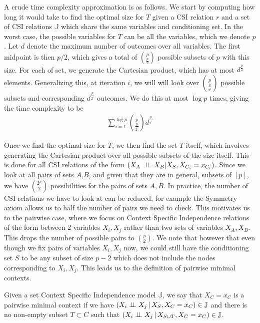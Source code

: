 \documentclass{tufte-book}
\begin{document}
\begin{Definition}
A crude time complexity approximation is as follows. We start by computing how long it would take to find the optimal size for \(T\) given a CSI relation \(r\) and a set of CSI relations \(\mathbb{J}\) which share the same variables and conditioning set. In the worst case, the possible variables for \(T\) can be all the variables, which we denote \(p\). Let \(d\) denote the maximum number of outcomes over all variables. The first midpoint is then \(p/2\), which gives a total of \(p\choose \frac{p}{2}\) possible subsets of \(p\) with this size. For each of set, we generate the Cartesian product, which has at most \(d^{\frac{p}{2}}\) elements. Generalizing this, at iteration \(i\), we will will look over \(p \choose \frac{p}{2^i}\) possible subsets and corresponding \(d^{\frac{p}{2^i}}\) outcomes. We do this at most \(\log p\) times, giving the time complexity to be
\begin{align*}
\sum_{i=1}^{\log p} {p\choose{\frac{p}{2^i}}}d^{\frac{p}{2^i}}
\end{align*}

Once we find the optimal size for \(T\), we then find the set \(T\) itself, which involves generating the Cartesian product over all possible subsets of the size itself. This is done for all CSI relations of the form \((X_A\,\perp \!\!\! \perp\,X_B|X_S,X_{C_i}=x_{C_i})\). Since we look at all pairs of sets \(A\),\(B\), and given that they are in general, subsets of \([p]\), we have \(2^p \choose 2\) possibilities for the pairs of sets \(A,B\). In practice, the number of CSI relations we have to look at can be reduced, for example the Symmetry axiom allows us to half the number of pairs we need to check. This motivates us to the pairwise case, where we focus on Context Specific Independence relations of the form between 2 variables \(X_i,X_j\) rather than two sets of variables \(X_A,X_B\). This drops the number of possible pairs to \(p \choose 2\). We note that however that even though we fix pairs of variables \(X_i,X_j\) now, we could still have the conditioning set \(S\) to be any subset of size \(p-2\) which does not include the nodes corresponding to \(X_i,X_j\). This leads us to the definition of pairwise minimal contexts.


\begin{definition}\label{def:pairmcs}
Given a set Context Specific Independence model $\mathbb{J}$, we say that ${X_C=x_C}$ is a pairwise minimal context if we have $(X_i  \perp \!\!\! \perp X_j \,|\, X_S, X_C=x_C) \in \mathbb{J}$ and there is no non-empty subset $T \subset C$ such that $(X_i \perp \!\!\! \perp X_j \,|\, X_{S \cup T}, X_C=x_C) \in \mathbb{J}$.
\end{definition}


\end{Definition}
\end{document}

